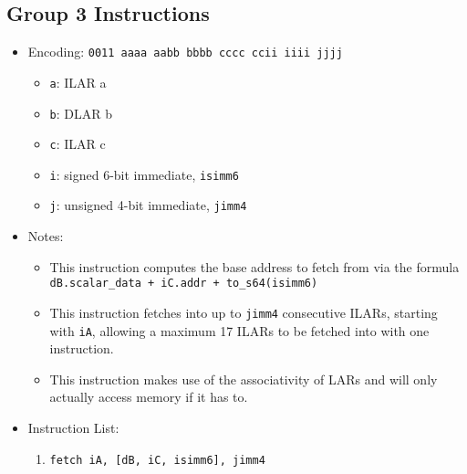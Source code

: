 \documentclass{article}
\begin{document}
	\subsection{Group 3 Instructions}
		\begin{itemize}
		\item Encoding:  \texttt{0011 aaaa aabb bbbb  cccc ccii iiii jjjj}
			\begin{itemize}
			\item \texttt{a}:  ILAR a
			\item \texttt{b}:  DLAR b
			\item \texttt{c}:  ILAR c
			\item \texttt{i}:  signed 6-bit immediate, \texttt{isimm6}
			\item \texttt{j}:  unsigned 4-bit immediate, \texttt{jimm4}
			\end{itemize}
		\item Notes:
			\begin{itemize}
			\item This instruction computes the base address to fetch from 
				via the formula
				\texttt{dB.scalar\_data + iC.addr + to\_s64(isimm6)}
			\item This instruction fetches into up to \texttt{jimm4}
				consecutive ILARs, starting with \texttt{iA}, allowing a
				maximum 17 ILARs to be fetched into with one instruction.
			\item This instruction makes use of the associativity of LARs
				and will only actually access memory if it has to.
			\end{itemize}
			
		\item Instruction List:
			\begin{enumerate}
			\item \texttt{fetch iA, [dB, iC, isimm6], jimm4}
			\end{enumerate}
		\end{itemize}
\end{document}
